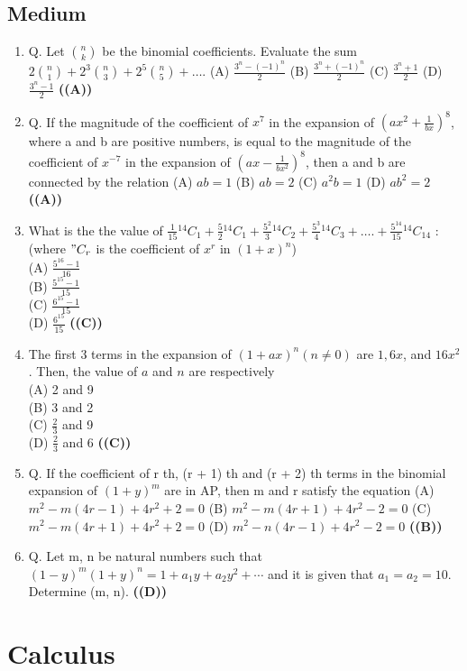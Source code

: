 \documentclass{article}
\begin{document}
\subsection{Medium}
\begin{enumerate}
\item Q. Let $\binom{n}{k}$ be the binomial coefficients. Evaluate the sum $2\binom{n}{1} + 2^3\binom{n}{3} + 2^5\binom{n}{5} + \dots$.
(A) $\frac{3^n - (-1)^n}{2}$
(B) $\frac{3^n + (-1)^n}{2}$
(C) $\frac{3^n + 1}{2}$
(D) $\frac{3^n - 1}{2}$ \hfill \textbf{((A))}
\item Q. If the magnitude of the coefficient of $x^7$ in the expansion of $(ax^2 + \frac{1}{bx})^8$, where a and b
are positive numbers, is equal to the magnitude of the coefficient of $x^{-7}$ in the expansion of
$(ax - \frac{1}{bx^2})^8$, then a and b are connected by the relation
(A) $ab = 1$
(B) $ab = 2$
(C) $a^2b = 1$
(D) $ab^2 = 2$ \hfill \textbf{((A))}
\item What is the the value of $\frac{1}{15} {}^{14}C_1+\frac{5}{2} {}^{14}C_1+\frac{5^2}{3} {}^{14}C_2+\frac{5^3}{4} {}^{14}C_3+\dots.+\frac{5^{14}}{15} {}^{14}C_{14}$ : (where $"C_r$ is the coefficient of $x^r$ in $(1 + x)^n$)\\
(A) $\frac{5^{16}-1}{16}$\\
(B) $\frac{5^{15}-1}{15}$\\
(C) $\frac{6^{15}-1}{15}$\\
(D) $\frac{6^{15}}{15}$ \hfill \textbf{((C))}
\item The first 3 terms in the expansion of $(1 + ax)^n(n \neq 0)$ are $1,6x$, and $16x^2$. Then, the value of $a$ and $n$ are respectively\\
(A) 2 and 9\\
(B) 3 and 2\\
(C) $\frac{2}{3}$ and 9\\
(D) $\frac{2}{3}$ and 6 \hfill \textbf{((C))}
\item Q. If the coefficient of r th, (r + 1) th and (r + 2) th terms in the binomial expansion of $(1 + y)^m$ are in AP, then m and r satisfy the equation
(A) $m^2 - m(4r - 1) + 4r^2 + 2 =0$
(B) $m^2 - m(4r + 1) + 4r^2 - 2 =0$
(C) $m^2 - m(4r + 1) + 4r^2 + 2 = 0$
(D) $m^2 - n(4r - 1) + 4r^2 - 2 = 0$ \hfill \textbf{((B))}
\item Q. Let m, n be natural numbers such that $(1 - y)^m (1 + y)^n = 1 + a_1y + a_2y^2 + \cdots$ and it is given that $a_1 = a_2 = 10$. Determine (m, n). \hfill \textbf{((D))}
\end{enumerate}
\section{Calculus}
\end{document}
